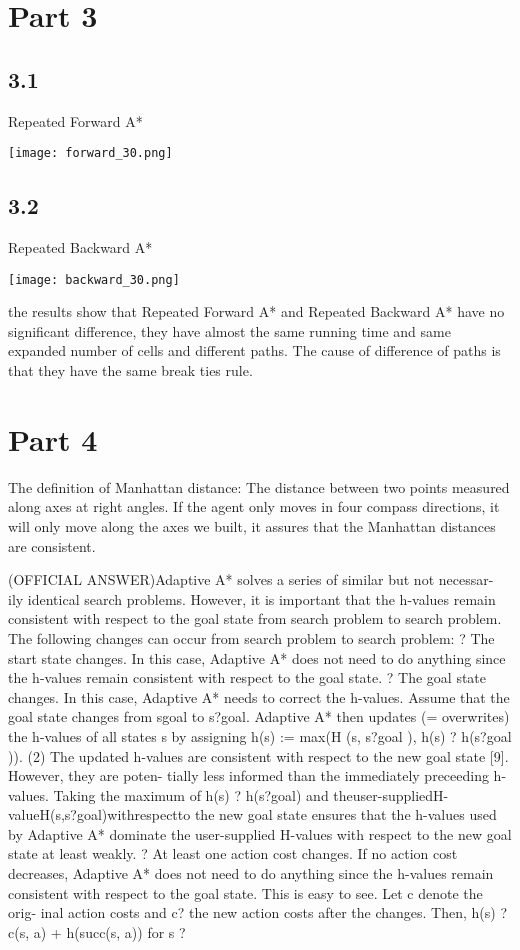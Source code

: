 \documentclass[12pt]{amsart}
\begin{document}
\section*{Part 3}
\subsection*{3.1}
Repeated Forward A*

\texttt{[image: forward\_30.png]}

\subsection*{3.2}
Repeated Backward A*

\texttt{[image: backward\_30.png]}

the results show that Repeated Forward A* and Repeated Backward A* have no significant difference, they have almost the same running time and same expanded number of cells and different paths. The cause of difference of paths is that they have the same break ties rule.
\section*{Part 4}
The definition of Manhattan distance: The distance between two points measured along axes at right angles. If the agent only moves in four compass directions, it will only move along the axes we built, it assures that the Manhattan distances are consistent.

(OFFICIAL ANSWER)Adaptive A* solves a series of similar but not necessar- ily identical search problems. However, it is important that the h-values remain consistent with respect to the goal state from search problem to search problem. The following changes can occur from search problem to search problem:
? The start state changes. In this case, Adaptive A* does not need to do anything since the h-values remain consistent with respect to the goal state.
? The goal state changes. In this case, Adaptive A* needs to correct the h-values. Assume that the goal state changes from sgoal to s?goal. Adaptive A* then updates (= overwrites) the h-values of all states s by assigning
h(s) := max(H (s, s?goal ), h(s) ? h(s?goal )). (2)
The updated h-values are consistent with respect to the new goal state [9]. However, they are poten- tially less informed than the immediately preceeding h-values. Taking the maximum of h(s) ? h(s?goal) and theuser-suppliedH-valueH(s,s?goal)withrespectto the new goal state ensures that the h-values used by Adaptive A* dominate the user-supplied H-values with respect to the new goal state at least weakly.
? At least one action cost changes. If no action cost decreases, Adaptive A* does not need to do anything since the h-values remain consistent with respect to the goal state. This is easy to see. Let c denote the orig- inal action costs and c? the new action costs after the changes. Then, h(s) ? c(s, a) + h(succ(s, a)) for s ?
\newpage
\end{document}
